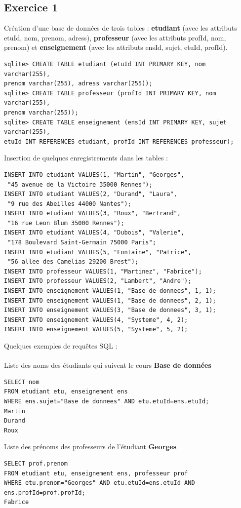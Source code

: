 \documentclass{article}
\begin{document}
\subsection{Exercice 1}
Cr\'eation d'une base de donn\'ees de trois tables : {\bfseries etudiant} (avec les attributs etuId, nom, prenom, adress), {\bfseries professeur} (avec les attributs profId, nom, prenom) et {\bfseries enseignement} (avec les attributs ensId, sujet, etuId, profId).\\
\begin{verbatim}
sqlite> CREATE TABLE etudiant (etuId INT PRIMARY KEY, nom varchar(255),
prenom varchar(255), adress varchar(255));
sqlite> CREATE TABLE professeur (profId INT PRIMARY KEY, nom varchar(255),
prenom varchar(255));
sqlite> CREATE TABLE enseignement (ensId INT PRIMARY KEY, sujet varchar(255),
etuId INT REFERENCES etudiant, profId INT REFERENCES professeur);
\end{verbatim}
Insertion de quelques enregistrements dans les tables :
\begin{verbatim}
INSERT INTO etudiant VALUES(1, "Martin", "Georges",
 "45 avenue de la Victoire 35000 Rennes");
INSERT INTO etudiant VALUES(2, "Durand", "Laura",
 "9 rue des Abeilles 44000 Nantes");
INSERT INTO etudiant VALUES(3, "Roux", "Bertrand",
 "16 rue Leon Blum 35000 Rennes");
INSERT INTO etudiant VALUES(4, "Dubois", "Valerie",
 "178 Boulevard Saint-Germain 75000 Paris";
INSERT INTO etudiant VALUES(5, "Fontaine", "Patrice",
 "56 allee des Camelias 29200 Brest");
INSERT INTO professeur VALUES(1, "Martinez", "Fabrice");
INSERT INTO professeur VALUES(2, "Lambert", "Andre");
INSERT INTO enseignement VALUES(1, "Base de donnees", 1, 1);
INSERT INTO enseignement VALUES(1, "Base de donnees", 2, 1);
INSERT INTO enseignement VALUES(3, "Base de donnees", 3, 1);
INSERT INTO enseignement VALUES(4, "Systeme", 4, 2);
INSERT INTO enseignement VALUES(5, "Systeme", 5, 2);
\end{verbatim}
Quelques exemples de requ\^etes SQL : \\\\
Liste des noms des \'etudiants qui suivent le cours {\bfseries Base de donn\'ees}
\begin{verbatim}
SELECT nom 
FROM etudiant etu, enseignement ens 
WHERE ens.sujet="Base de donnees" AND etu.etuId=ens.etuId;
Martin
Durand
Roux
\end{verbatim}
Liste des pr\'enoms des professeurs de l'\'etudiant {\bfseries Georges}
\begin{verbatim}
SELECT prof.prenom 
FROM etudiant etu, enseignement ens, professeur prof 
WHERE etu.prenom="Georges" AND etu.etuId=ens.etuId AND ens.profId=prof.profId;
Fabrice
\end{verbatim}
\end{document}

